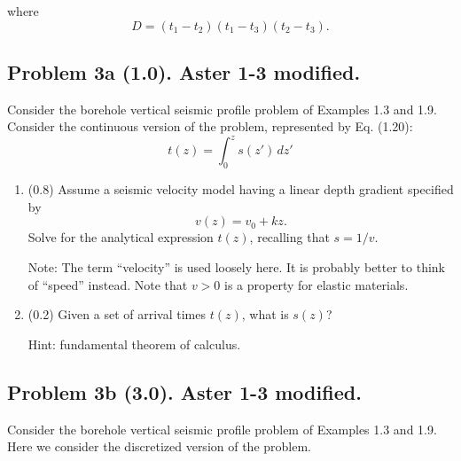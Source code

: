 \documentclass[11pt,titlepage,fleqn]{article}
\begin{document}
%
where
%
\begin{equation}
D = (t_1-t_2)(t_1-t_3)(t_2-t_3).
\end{equation}


\subsection*{Problem 3a (1.0). Aster 1-3 modified.}

Consider the borehole vertical seismic profile problem of Examples 1.3 and 1.9. Consider the continuous version of the problem, represented by Eq. (1.20):
%
\begin{equation}
t(z) = \int_0^z s(z')\,dz'
\label{tz}
\end{equation}

\begin{enumerate}

\item (0.8) Assume a seismic velocity model having a linear depth gradient specified by
%
\begin{equation}
v(z) = v_0 + kz.
\label{vz}
\end{equation}
%
Solve for the analytical expression $t(z)$, recalling that $s = 1/v$.

Note: The term ``velocity'' is used loosely here. It is probably better to think of ``speed'' instead. Note that $v > 0$ is a property for elastic materials.


\item (0.2) Given a set of arrival times $t(z)$, what is $s(z)$?

Hint: fundamental theorem of calculus.

\end{enumerate}


\subsection*{Problem 3b (3.0). Aster 1-3 modified.}

Consider the borehole vertical seismic profile problem of Examples 1.3 and 1.9. Here we consider the discretized version of the problem. 
\end{document}
